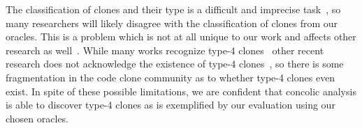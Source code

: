 \documentclass{sig-alternate}
\begin{document}
The classification of clones and their type is a difficult and imprecise task~\cite{Walenstein:2003:PCT:950792.951349}, so many researchers will likely disagree with the classification of clones from our oracles. This is a problem which is not at all unique to our work and affects other research as well~\cite{Lavoie:2011:ATC:1985404.1985411}. While many works recognize type-4 clones~\cite{Roy:2009:CEC:1530898.1531101,4288192} other recent research does not acknowledge the existence of type-4 clones~\cite{Duala-Ekoko:2010:CRD:1767751.1767754,Lavoie:2011:ATC:1985404.1985411}, so there is some fragmentation in the code clone community as to whether type-4 clones even exist. In spite of these possible limitations, we are confident that concolic analysis is able to discover type-4 clones as is exemplified by our evaluation using our chosen oracles.












\end{document}
